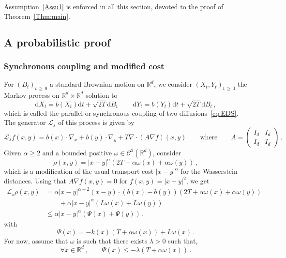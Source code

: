 \documentclass[10pt]{amsart}
\theoremstyle{definition}\newtheorem{defi}[theo]{Definition}\newtheorem{rema}[theo]{Remark}\newtheorem{exam}[theo]{Example}\newtheorem{exem}[theo]{Example}\newtheorem{nota}[theo]{Notation}
\newcommand{\R}{\mathbb R}
\newcommand{\clC}{\mathcal C}
\newcommand{\clL}{\mathcal L}
\newcommand{\dd}{\mathrm{d}}
\newcommand{\na}{\nabla}
\newcommand{\1}{\mathbbm{1}}
\newcommand{\nv}[1]{#1}
\let\oldforall\forall
\renewcommand*{\forall}{\mathrel{\oldforall}}
\begin{document}
Assumption~\ref{Assu1} is enforced in all this section, devoted to the proof of Theorem~\ref{Thm:main}.

\subsection{A probabilistic proof}\label{sec:demo-couplage}

\subsubsection{Synchronous coupling and modified \nv{cost}}\label{Sec:preuve_couplage}
For $(B_t)_{t\,\geqslant\,0}$ a standard Brownian motion on $\R^d$, we consider $(X_t,Y_t)_{t\,\geqslant\,0}$ the Markov process on $\R^d\times\R^d$ solution to
\[
\dd X_t = b(X_t) \dd t + \sqrt{2T}\dd B_t\,\qquad \dd Y_t = b(Y_t) \dd t + \sqrt{2T}\dd B_t\,,
\]
which is called the parallel or synchronous coupling of two diffusions~\eqref{eq:EDS}. The generator $\clL_s$ of this process is given by
\[
\clL_s f(x,y) = b(x)\cdot\na_x + b(y)\cdot \na_y + T \na \cdot \left( A \na f\right) (x,y) \qquad \text{where} \qquad A=
\begin{pmatrix} I_d & I_d \\ I_d & I_d
\end{pmatrix} \,.
\]
Given $\alpha\geqslant 2$ and a bounded positive $\nv{\omega}\in\clC^2(\R^d)$, consider
\[
\rho(x,y)=|x-y|^\alpha \left( 2T + \alpha \nv{\omega}(x)+ \alpha \nv{\omega}(y)\right)\,,
\]
which is a modification of the usual transport cost $|x-y|^\alpha$ for the Wasserstein distances. Using that $A \na f(x,y)=0$ for $f(x,y)=|x-y|^2$, we get
\begin{align*}
\clL_s \rho(x,y) & = \alpha |x-y|^{\alpha-2} (x-y)\cdot \left( b(x)-b(y)\right) \left( 2T + \alpha \nv{\omega}(x)+ \alpha \nv{\omega}(y)\right) \\
& \qquad + \alpha |x-y|^{\alpha} \left( L\nv{\omega}(x)+L\nv{\omega}(y)\right)\\
& \leqslant \alpha |x-y|^{\alpha} \left( \Psi(x)+\Psi(y)\right)\,,
\end{align*}
with
\begin{equation}\label{eq:Psi}
\Psi(x) = - k(x) \left( T + \alpha \nv{\omega}(x)\right) + L\nv{\omega}(x)\,.
\end{equation}
For now, assume that $\nv{\omega}$ is such that there exists $\lambda>0$ such that,
\begin{equation}\label{eq:conditionPsi}
\forall x\in\R^d\,,\qquad \Psi(x) \leqslant -\lambda \left( T+\alpha \nv{\omega}(x) \right)\,.
\end{equation}
\end{document}
